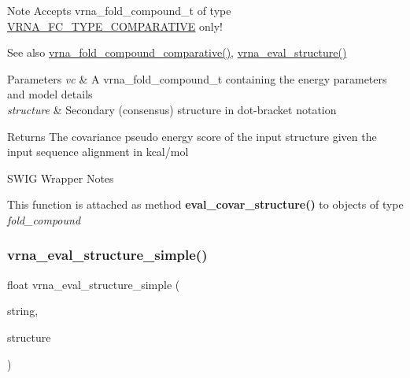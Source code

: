 \begin{DoxyNote}{Note}
Accepts vrna\+\_\+fold\+\_\+compound\+\_\+t of type \hyperlink{group__fold__compound_gga01a4ff86fa71deaaa5d1abbd95a1447dab821ce46ea3cf665be97df22a76f5023}{V\+R\+N\+A\+\_\+\+F\+C\+\_\+\+T\+Y\+P\+E\+\_\+\+C\+O\+M\+P\+A\+R\+A\+T\+I\+VE} only!
\end{DoxyNote}
\begin{DoxySeeAlso}{See also}
\hyperlink{group__fold__compound_gad6bacc816af274922b13d947f708aa0c}{vrna\+\_\+fold\+\_\+compound\+\_\+comparative()}, \hyperlink{group__eval_ga58f199f1438d794a265f3b27fc8ea631}{vrna\+\_\+eval\+\_\+structure()}
\end{DoxySeeAlso}

\begin{DoxyParams}{Parameters}
{\em vc} & A vrna\+\_\+fold\+\_\+compound\+\_\+t containing the energy parameters and model details \\
\hline
{\em structure} & Secondary (consensus) structure in dot-\/bracket notation \\
\hline
\end{DoxyParams}
\begin{DoxyReturn}{Returns}
The covariance pseudo energy score of the input structure given the input sequence alignment in kcal/mol
\end{DoxyReturn}
\begin{DoxyRefDesc}{S\+W\+I\+G Wrapper Notes}
\item[\hyperlink{wrappers__wrappers000029}{S\+W\+I\+G Wrapper Notes}]This function is attached as method {\bfseries eval\+\_\+covar\+\_\+structure()} to objects of type {\itshape fold\+\_\+compound} \end{DoxyRefDesc}
\mbox{\label{group__eval_gab6930f446d04761454d033680fbf7909}} 
\subsubsection{\texorpdfstring{vrna\+\_\+eval\+\_\+structure\+\_\+simple()}{vrna\_eval\_structure\_simple()}}
{\footnotesize\ttfamily float vrna\+\_\+eval\+\_\+structure\+\_\+simple (\begin{DoxyParamCaption}\item[{const char $\ast$}]{string,  }\item[{const char $\ast$}]{structure }\end{DoxyParamCaption})}



